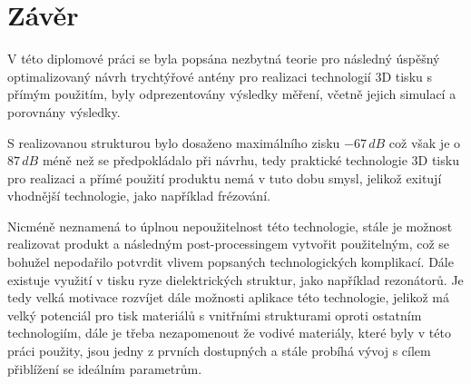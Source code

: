 \chapter{Závěr}
V této diplomové práci se byla popsána nezbytná teorie pro následný úspěšný optimalizovaný návrh trychtýřové antény pro realizaci technologií 3D tisku s přímým použitím, byly odprezentovány výsledky měření, včetně jejich simulací a porovnány výsledky.

S realizovanou strukturou bylo dosaženo maximálního zisku $-67\,dB$ což však je o $87\,dB$ méně než se předpokládalo při návrhu, tedy praktické technologie 3D tisku pro realizaci a přímé použití produktu nemá v tuto dobu smysl, jelikož exitují vhodnější technologie, jako například frézování.

Nicméně neznamená to úplnou nepoužitelnost této technologie, stále je možnost realizovat produkt a následným post-processingem vytvořit použitelným, což se bohužel nepodařilo potvrdit vlivem popsaných technologických komplikací. Dále existuje využití v tisku ryze dielektrických struktur, jako například rezonátorů. Je tedy velká motivace rozvíjet dále možnosti aplikace této technologie, jelikož má velký potenciál pro tisk materiálů s vnitřními strukturami oproti ostatním technologiím, dále je třeba nezapomenout že vodivé materiály, které byly v této práci použity, jsou jedny z prvních dostupných a stále probíhá vývoj s cílem přiblížení se ideálním parametrům.

